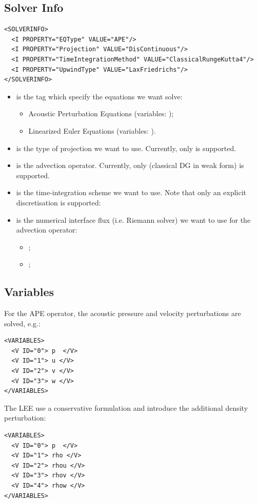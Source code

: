 \subsection{Solver Info}
\begin{lstlisting}[style=XmlStyle]
<SOLVERINFO>
  <I PROPERTY="EQType" VALUE="APE"/>
  <I PROPERTY="Projection" VALUE="DisContinuous"/>
  <I PROPERTY="TimeIntegrationMethod" VALUE="ClassicalRungeKutta4"/>
  <I PROPERTY="UpwindType" VALUE="LaxFriedrichs"/>
</SOLVERINFO>
\end{lstlisting}
\begin{itemize}
    \item {} is the tag which specify the equations we want solve:
    \begin{itemize}
        \item {} Acoustic Perturbation Equations (variables: );
        \item {} Linearized Euler Equations (variables: ).
    \end{itemize}
    \item {} is the type of projection we want to use. Currently, only  is supported.
    \item {} is the advection operator. Currently, only  (classical DG in weak form) is supported.
    \item {} is the time-integration scheme we want to use. 
    Note that only an explicit discretisation is supported:
    \item {} is the numerical interface flux (i.e. Riemann solver) 
    we want to use for the advection operator:
    \begin{itemize}
        \item {};
        \item {}; 
    \end{itemize}
\end{itemize}

\subsection{Variables}
For the APE operator, the acoustic pressure and velocity perturbations are solved, e.g.:
\begin{lstlisting}[style=XmlStyle]
<VARIABLES>
  <V ID="0"> p  </V>
  <V ID="1"> u </V>
  <V ID="2"> v </V>
  <V ID="3"> w </V>
</VARIABLES>
\end{lstlisting}
The LEE use a conservative formulation and introduce the additional density perturbation:
\begin{lstlisting}[style=XmlStyle]
<VARIABLES>
  <V ID="0"> p  </V>
  <V ID="1"> rho </V>
  <V ID="2"> rhou </V>
  <V ID="3"> rhov </V>
  <V ID="4"> rhow </V>
</VARIABLES>
\end{lstlisting}


